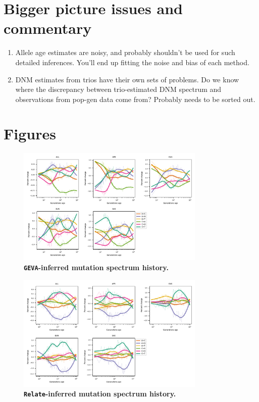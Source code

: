 \documentclass[]{article}
\begin{document}
\section{Bigger picture issues and commentary}

\begin{enumerate}
    \item Allele age estimates are noisy, and probably shouldn't be used
        for such detailed inferences. You'll end up fitting the noise and
        bias of each method.
    \item DNM estimates from trios have their own sets of problems. Do we
        know where the discrepancy between trio-estimated DNM spectrum and
        observations from pop-gen data come from? Probably needs to be
        sorted out.
\end{enumerate}

\break

\section{Figures}

\begin{figure}[ht!]
    \centering
    \includegraphics[width=0.8\textwidth]{../plots/spectrum_history.geva.max_age.10000.pdf}
    \caption{
        \textbf{\texttt{GEVA}-inferred mutation spectrum history.}
    }
    \label{fig:geva-spectra}
\end{figure}

\begin{figure}[ht!]
    \centering
    \includegraphics[width=0.8\textwidth]{../plots/spectrum_history.relate.max_age.10000.pdf}
    \caption{
        \textbf{\texttt{Relate}-inferred mutation spectrum history.}
    }
    \label{fig:relate-spectra}
\end{figure}
\end{document}
